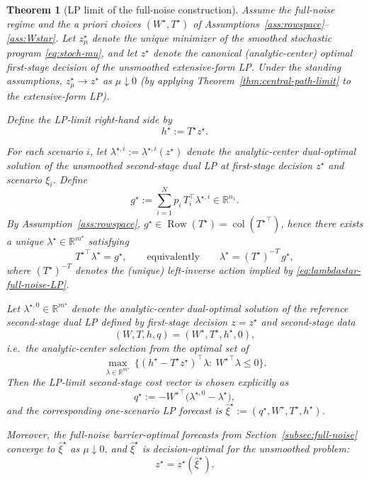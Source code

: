 \documentclass[11pt]{article}
\theoremstyle{plain}
\newtheorem{theorem}{Theorem}[section]
\theoremstyle{definition}
\theoremstyle{remark}
\newcommand{\Row}{\operatorname{Row}}
\newcommand{\col}{\operatorname{col}}
\begin{document}
\begin{theorem}[LP limit of the full-noise construction]\label{thm:full-noise-LP}
Assume the full-noise regime and the a priori choices $(W^\star,T^\star)$ of
Assumptions~\ref{ass:rowspace}--\ref{ass:Wstar}. Let $z_\mu^\star$ denote the unique minimizer of the smoothed stochastic
program \eqref{eq:stoch-mu}, and let $z^\star$ denote the canonical (analytic-center) optimal first-stage decision of the
\emph{unsmoothed} extensive-form LP. Under the standing assumptions, $z_\mu^\star\to z^\star$ as $\mu\downarrow 0$
(by applying Theorem~\ref{thm:central-path-limit} to the extensive-form LP).

Define the LP-limit right-hand side by
\begin{equation}\label{eq:hstar-full-noise-LP}
h^\star := T^\star z^\star.
\end{equation}

For each scenario $i$, let $\lambda^{\star,i}:=\lambda^{\star,i}(z^\star)$ denote the analytic-center dual-optimal solution
of the \emph{unsmoothed} second-stage dual LP at first-stage decision $z^\star$ and scenario $\xi_i$.
Define
\[
g^\star := \sum_{i=1}^N p_i\,T_i^\top \lambda^{\star,i}\in\mathbb{R}^{n_1}.
\]
By Assumption~\ref{ass:rowspace}, $g^\star\in\Row(T^\star)=\col({T^\star}^\top)$, hence there exists a unique
$\lambda^\star\in\mathbb{R}^{m^\star}$ satisfying
\begin{equation}\label{eq:lambdastar-full-noise-LP}
{T^\star}^\top \lambda^\star = g^\star,
\qquad\text{equivalently}\qquad
\lambda^\star = (T^\star)^{-T}\,g^\star,
\end{equation}
where $(T^\star)^{-T}$ denotes the (unique) left-inverse action implied by \eqref{eq:lambdastar-full-noise-LP}.

Let $\lambda^{\star,0}\in\mathbb{R}^{m^\star}$ denote the analytic-center dual-optimal solution of the \emph{reference}
second-stage dual LP defined by first-stage decision $z=z^\star$ and second-stage data
\[
(W,T,h,q)=(W^\star,T^\star,h^\star,0),
\]
i.e.\ the analytic-center selection from the optimal set of
\[
\max_{\lambda\in\mathbb{R}^{m^\star}}\ \{(h^\star-T^\star z^\star)^\top\lambda:\ {W^\star}^\top\lambda\le 0\}.
\]
Then the LP-limit second-stage cost vector is chosen explicitly as
\begin{equation}\label{eq:qstar-full-noise-LP}
q^\star := -{W^\star}^\top\bigl(\lambda^{\star,0}-\lambda^\star\bigr),
\end{equation}
and the corresponding one-scenario LP forecast is $\hat\xi^\star:=(q^\star,W^\star,T^\star,h^\star)$.

Moreover, the full-noise barrier-optimal forecasts from Section~\ref{subsec:full-noise} converge to $\hat\xi^\star$ as
$\mu\downarrow 0$, and $\hat\xi^\star$ is decision-optimal for the \emph{unsmoothed} problem:
\[
z^\star = z^\star(\hat\xi^\star).
\]
\end{theorem}
\end{document}
